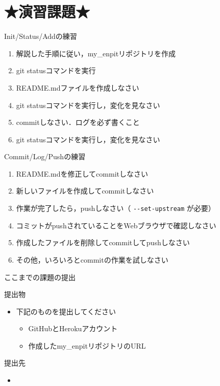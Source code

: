 \documentclass[t, aspectratio=169]{beamer}
\begin{document}
\section{★演習課題★}
\label{sec-2-4}
\begin{frame}[label=sec-2-4-1]{Init/Status/Addの練習}
\begin{enumerate}
\item 解説した手順に従い，my\_enpitリポジトリを作成
\item git statusコマンドを実行
\item README.mdファイルを作成しなさい
\item git statusコマンドを実行し，変化を見なさい
\item commitしなさい．ログを必ず書くこと
\item git statusコマンドを実行し，変化を見なさい
\end{enumerate}
\end{frame}
\begin{frame}[fragile,label=sec-2-4-2]{Commit/Log/Pushの練習}
 \begin{enumerate}
\item README.mdを修正してcommitしなさい
\item 新しいファイルを作成してcommitしなさい
\item 作業が完了したら，pushしなさい（ \texttt{-{}-set-upstream} が必要）
\item コミットがpushされていることをWebブラウザで確認しなさい
\item 作成したファイルを削除してcommitしてpushしなさい
\item その他，いろいろとcommitの作業を試しなさい
\end{enumerate}
\end{frame}
\begin{frame}[label=sec-2-4-3]{ここまでの課題の提出}
\begin{block}{提出物}
\begin{itemize}
\item 下記のものを提出してください
\begin{itemize}
\item GitHubとHerokuアカウント
\item 作成したmy\_enpitリポジトリのURL
\end{itemize}
\end{itemize}
\end{block}
\begin{block}{提出先}
\begin{itemize}
\item\relax [\href{https://docs.google.com/forms/d/1SiKQqDLQw2YiJieYVS79ywpHIaNC3uI9cNPb_ddhC1Q/viewform?usp=send_form}{enPiT演習アカウント(2014)}]
\end{itemize}
\end{block}
\end{frame}
\end{document}
